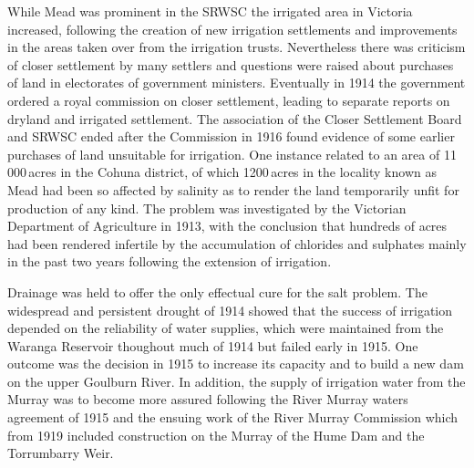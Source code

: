 While Mead was prominent in the SRWSC the irrigated area in Victoria
increased, following the creation of new irrigation settlements and
improvements in the areas taken over from the irrigation trusts.
Nevertheless there was criticism of closer settlement by many settlers
and questions were raised about purchases of land in electorates of
government ministers.  Eventually in 1914 the government ordered a
royal commission on closer settlement, leading to separate reports on
dryland and irrigated settlement.  The association of the Closer
Settlement Board and SRWSC ended after the Commission in 1916 found
evidence of some earlier purchases of land unsuitable for irrigation.
One instance related to an area of 11\,000\,acres in the Cohuna
district, of which 1200\,acres in the locality known as Mead had been
so affected by salinity  as to render the land
temporarily unfit for production of any kind.  The problem was
investigated by the Victorian Department of Agriculture in 1913, with
the conclusion that hundreds of acres had been rendered infertile by
the accumulation of chlorides and sulphates mainly in the past two
years following the extension of irrigation.

Drainage  was held to offer the only effectual cure
for the salt problem.  The widespread and persistent
drought of 1914 showed that the success of irrigation
depended on the reliability of water supplies, wh\-ich were maintained
from the Waranga Reservoir thoughout much of 1914 but failed early in
1915.  One outcome was the decision in 1915 to increase its capacity
and to build a new dam on the upper Goulburn
River.  In addition, the supply of irrigation
water from the Murray was to become more assured following the River
Murray waters agreement of 1915 and the ensuing work of the River
Murray Commission which from 1919 included construction on the Murray
of the Hume Dam   and the
Torrumbarry Weir.

